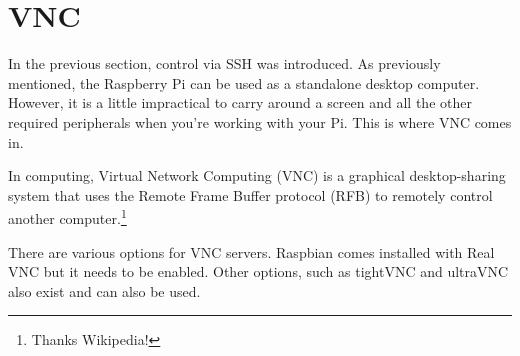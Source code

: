 \section{VNC}
\label{app:Services-VNC}
In the previous section, control via SSH was introduced. As previously mentioned, the Raspberry Pi can be used as a standalone desktop computer. However, it is a little impractical to carry around a screen and all the other required peripherals when you're working with your Pi. This is where VNC comes in.

In computing, Virtual Network Computing (VNC) is a graphical desktop-sharing system that uses the Remote Frame Buffer protocol (RFB) to remotely control another computer.\footnote{Thanks Wikipedia!}

There are various options for VNC servers. Raspbian comes installed with Real VNC but it needs to be enabled. Other options, such as tightVNC and ultraVNC also exist and can also be used. 

